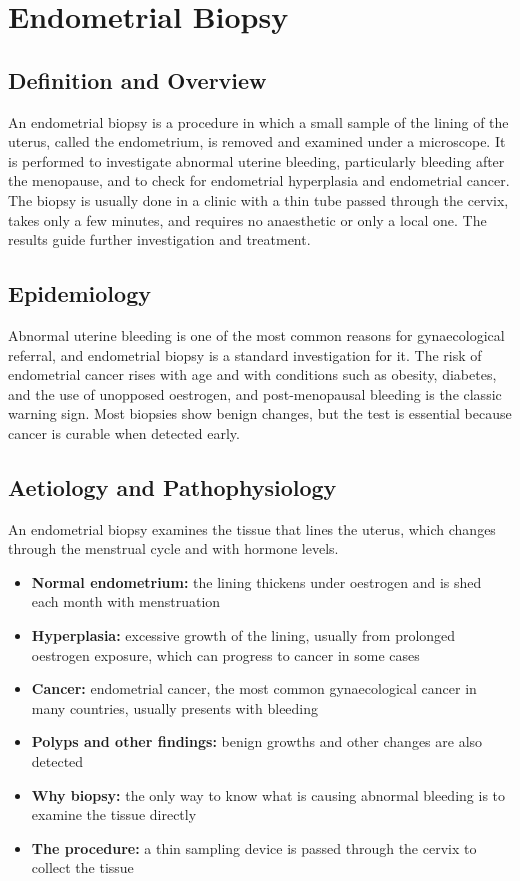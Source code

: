 \chapter{Endometrial Biopsy}

\section*{Definition and Overview}
An endometrial biopsy is a procedure in which a small sample of the lining of the uterus, called the endometrium, is removed and examined under a microscope. It is performed to investigate abnormal uterine bleeding, particularly bleeding after the menopause, and to check for endometrial hyperplasia and endometrial cancer. The biopsy is usually done in a clinic with a thin tube passed through the cervix, takes only a few minutes, and requires no anaesthetic or only a local one. The results guide further investigation and treatment.

\section*{Epidemiology}
Abnormal uterine bleeding is one of the most common reasons for gynaecological referral, and endometrial biopsy is a standard investigation for it. The risk of endometrial cancer rises with age and with conditions such as obesity, diabetes, and the use of unopposed oestrogen, and post-menopausal bleeding is the classic warning sign. Most biopsies show benign changes, but the test is essential because cancer is curable when detected early.

\section*{Aetiology and Pathophysiology}
An endometrial biopsy examines the tissue that lines the uterus, which changes through the menstrual cycle and with hormone levels.
\begin{itemize}
    \item \textbf{Normal endometrium:} the lining thickens under oestrogen and is shed each month with menstruation
    \item \textbf{Hyperplasia:} excessive growth of the lining, usually from prolonged oestrogen exposure, which can progress to cancer in some cases
    \item \textbf{Cancer:} endometrial cancer, the most common gynaecological cancer in many countries, usually presents with bleeding
    \item \textbf{Polyps and other findings:} benign growths and other changes are also detected
    \item \textbf{Why biopsy:} the only way to know what is causing abnormal bleeding is to examine the tissue directly
    \item \textbf{The procedure:} a thin sampling device is passed through the cervix to collect the tissue
\end{itemize}

